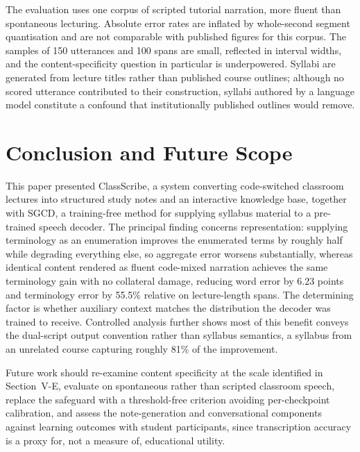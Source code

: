 \documentclass[conference]{IEEEtran}
\begin{document}
The evaluation uses one corpus of scripted tutorial narration, more fluent than
spontaneous lecturing. Absolute error rates are inflated by whole-second segment
quantisation and are not comparable with published figures for this corpus. The
samples of 150 utterances and 100 spans are small, reflected in interval widths,
and the content-specificity question in particular is underpowered. Syllabi are
generated from lecture titles rather than published course outlines; although no
scored utterance contributed to their construction, syllabi authored by a language
model constitute a confound that institutionally published outlines would remove.

\section{Conclusion and Future Scope}

This paper presented ClassScribe, a system converting code-switched classroom
lectures into structured study notes and an interactive knowledge base, together
with SGCD, a training-free method for supplying syllabus material to a
pre-trained speech decoder. The principal finding concerns representation:
supplying terminology as an enumeration improves the enumerated terms by roughly
half while degrading everything else, so aggregate error worsens substantially,
whereas identical content rendered as fluent code-mixed narration achieves the
same terminology gain with no collateral damage, reducing word error by 6.23
points and terminology error by 55.5\% relative on lecture-length spans. The
determining factor is whether auxiliary context matches the distribution the
decoder was trained to receive. Controlled analysis further shows most of this
benefit conveys the dual-script output convention rather than syllabus semantics,
a syllabus from an unrelated course capturing roughly 81\% of the improvement.

Future work should re-examine content specificity at the scale identified in
Section~V-E, evaluate on spontaneous rather than scripted classroom speech,
replace the safeguard with a threshold-free criterion avoiding per-checkpoint
calibration, and assess the note-generation and conversational components against
learning outcomes with student participants, since transcription accuracy is a
proxy for, not a measure of, educational utility.
\end{document}
